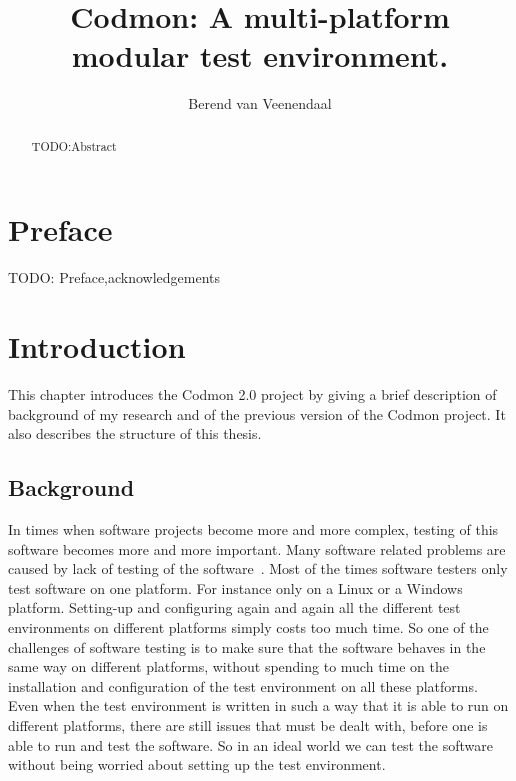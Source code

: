 \documentclass[a4paper,10pt]{scrartcl}
\title{Codmon: A multi-platform modular test environment.}
\author{Berend van Veenendaal}
\newcommand{\project}{Codmon 2.0}
\begin{document}
\maketitle

\begin{abstract}
TODO:Abstract
\end{abstract}
\newpage
\section*{Preface}
\label{sec:Preface}
TODO: Preface,acknowledgements
\newpage
\tableofcontents
\newpage

\section{Introduction}
\label{sec:Introduction}
This chapter introduces the \project{} project by giving a brief description of background of my research and of the
previous version of the Codmon project. It also describes the structure of this thesis.

\subsection{Background}
\label{sec:Background}
In times when software projects become more and more complex, testing of this software becomes more and more important. Many software related problems are caused by lack of testing of the 
software~\cite{TTCST}. Most of the times software testers only test software on one platform. For instance only on a Linux or a Windows platform. Setting-up and configuring again and again all 
the different test environments on different platforms simply costs too much time. So one of the challenges of software testing is to make sure that the software behaves in the same way on 
different platforms, without spending to much time on the installation and configuration of the test environment on all these platforms. Even when the test environment is written in such a way 
that it is able to run on different platforms, there are still issues that must be dealt with, before one is able to run and test the software. So in an ideal world we can test the software without being 
worried about setting up the test environment. 
\end{document}
